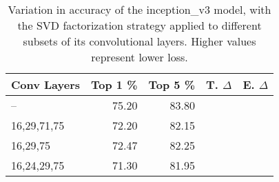 \begin{table}
\centering
\begin{tabular}{|l|r|r|r|r|}
\hline
Conv Layers & Top 1 \% & Top 5 \% & T. $\Delta$ & E. $\Delta$ \\\hline 
-- & 75.20 & 83.80  &  & \\\hline
16,29,71,75 & 72.20 & 82.15 &  &  \\\hline
16,29,75 & 72.47 & 82.25 &  &  \\\hline
16,24,29,75 & 71.30 & 81.95 &  &  \\\hline
\end{tabular}
\caption{Variation in accuracy of the inception\_v3 model, with the SVD factorization strategy applied to different subsets of its convolutional layers. Higher values represent lower loss.}
\label{inception_v3-accuracy}
\end{table}
